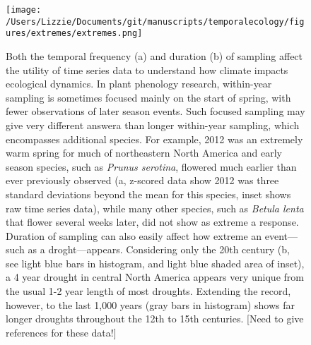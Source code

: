 \documentclass[11pt,a4paper,oneside]{article}
\begin{document}
\begin{figure}[h!]
\centering
\noindent \texttt{[image: /Users/Lizzie/Documents/git/manuscripts/temporalecology/figures/extremes/extremes.png]}
\caption{Both the temporal frequency (a) and duration (b) of sampling affect the utility of time series data to understand how climate impacts ecological dynamics. In plant phenology research, within-year sampling is sometimes focused mainly on the start of spring, with fewer observations of later season events. Such focused sampling may give very different answera than longer within-year sampling, which encompasses additional species. For example, 2012 was an extremely warm spring for much of northeastern North America and early season species, such as \emph{Prunus serotina}, flowered much earlier than ever previously observed (a, z-scored data show 2012 was three standard deviations beyond the mean for this species, inset shows raw time series data), while many other species, such as \emph{Betula lenta} that flower several weeks later, did not show as extreme a response. Duration of sampling can also easily affect how extreme an event---such as a droght---appears. Considering only the 20th century (b, see light blue bars in histogram, and light blue shaded area of inset), a 4 year drought in central North America appears very unique from the usual 1-2 year length of most droughts. Extending the record, however, to the last 1,000 years (gray bars in histogram) shows far longer droughts throughout the 12th to 15th centuries. [Need to give references for these data!]}
\end{figure}

\newpage
\end{document}
